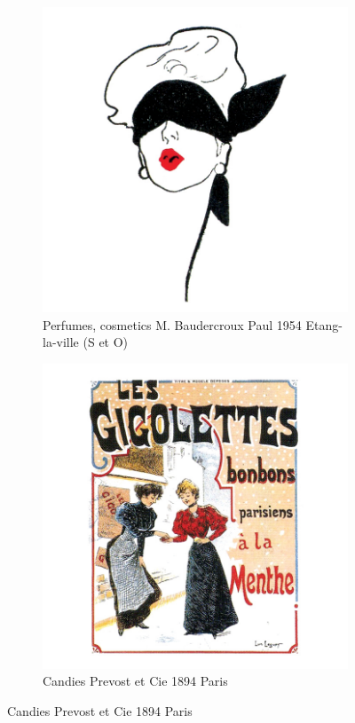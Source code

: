 \begin{figure}[h]
  \begin{subfigure}{.45\textwidth}
    \centering
    \includegraphics[width=.5\linewidth]{images/supplement/trademarks/french/21_32}
    \caption{Perfumes, cosmetics M. Baudercroux Paul 1954 Etang-la-ville (S et O)}
    \label{fig:trademarks:french:21.32}
  \end{subfigure}\hfill
  \begin{subfigure}{.45\textwidth}
    \centering
    \includegraphics[width=.5\linewidth]{images/supplement/trademarks/french/21_34}
    \caption{Candies Prevost et Cie 1894 Paris}
    \label{fig:trademarks:french:21.34}
  \end{subfigure}
\end{figure}

